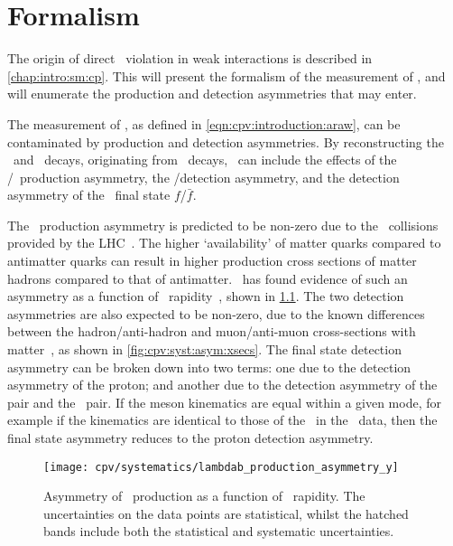 \chapter{Formalism}
\label{chap:cpv:theory}

The origin of direct \CP\ violation in weak interactions is described in 
\cref{chap:intro:sm:cp}.
This  will present the formalism of the measurement 
of \dACP, and will enumerate the production and detection asymmetries that may 
enter.

The measurement of \ARaw, as defined in \cref{eqn:cpv:introduction:araw}, can 
be contaminated by production and detection asymmetries.
By reconstructing the \LcTopKK\ and \LcToppipi\ decays, originating from 
\ decays, \ARaw\ can include the effects of 
the \PLambdab/\APLambdab\ production asymmetry, the \Pmuon/\APmuon detection 
asymmetry, and the detection asymmetry of the \PLambdac\ final state 
$f$/$\bar{f}$.

The \PLambdab\ production asymmetry is predicted to be non-zero due to the \pp\ 
collisions provided by the \ac{LHC}~\cite{PhysRevD.90.014023}.
The higher `availability' of matter quarks compared to antimatter quarks can 
result in higher production cross sections of matter hadrons compared to that 
of antimatter.
\lhcb\ has found evidence of such an asymmetry as a function of \PLambdab\ 
rapidity~\cite{Aaij:2015fea}, shown in \cref{fig:cpv:syst:asym:lambdab}.
The two detection asymmetries are also expected to be non-zero, due to the 
known differences between the hadron/anti-hadron and muon/anti-muon 
cross-sections with matter~\cite{PDG2014}, as shown in 
\cref{fig:cpv:syst:asym:xsecs}.
The final state detection asymmetry can be broken down into two terms: one due 
to the detection asymmetry of the proton; and another due to the detection 
asymmetry of the \KmKp pair and the \pimpip\ pair.
If the meson kinematics are equal within a given mode, for example if the 
\PKminus kinematics are identical to those of the \PKplus\ in the \pKK\ data, 
then the final state asymmetry reduces to the proton detection asymmetry.

\begin{figure}
  \centering
  \texttt{[image: cpv/systematics/lambdab\_production\_asymmetry\_y]}
  \caption{%
    Asymmetry of \PLambdab\ production as a function of \PLambdab\ rapidity.
    The uncertainties on the data points are statistical, whilst the hatched 
    bands include both the statistical and systematic uncertainties.
  }
  \label{fig:cpv:syst:asym:lambdab}
\end{figure}

